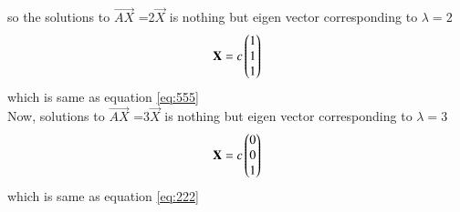\documentclass[journal,12pt,twocolumn]{IEEEtran}
\begin{document}
\begin{flushleft}
so the solutions to  $\vec {AX}$ =2$\vec{X}$ is nothing but eigen vector corresponding to $\lambda=2$
\begin{align}
  \mathbf{X} =
 c
 \begin{pmatrix}
 1\\1\\1
 \end{pmatrix} 
\end{align}
which is same as  equation \ref{eq:555}\\
Now,
 solutions to  $\vec {AX}$ =3$\vec{X}$ is nothing but eigen vector corresponding to $\lambda=3$
 \begin{align}
  \mathbf{X} =
 c
 \begin{pmatrix}
 0\\0\\1
 \end{pmatrix} 
 \end{align}
 which is same as equation \ref{eq:222}
\end{flushleft}
\end{document}
